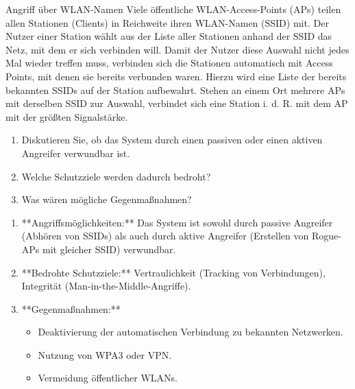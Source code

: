 \documentclass{article}
\begin{document}
\begin{exercise}{Angriff über WLAN-Namen}
  Viele öffentliche WLAN-Access-Points (APs) teilen allen Stationen (Clients) in Reichweite ihren WLAN-Namen (SSID) mit. Der Nutzer einer Station wählt aus der Liste aller Stationen anhand der SSID das Netz, mit dem er sich verbinden will. Damit der Nutzer diese Auswahl nicht jedes Mal wieder treffen muss, verbinden sich die Stationen automatisch mit Access Points, mit denen sie bereits verbunden waren. Hierzu wird eine Liste der bereits bekannten SSIDs auf der Station aufbewahrt. Stehen an einem Ort mehrere APs mit derselben SSID zur Auswahl, verbindet sich eine Station i. d. R. mit dem AP mit der größten Signalstärke.
  \begin{enumerate}
    \item Diskutieren Sie, ob das System durch einen passiven oder einen aktiven Angreifer verwundbar ist.
    \item Welche Schutzziele werden dadurch bedroht?
    \item Was wären mögliche Gegenmaßnahmen?
  \end{enumerate}

  \begin{solution}
    \begin{enumerate}
      \item **Angriffsmöglichkeiten:** Das System ist sowohl durch passive Angreifer (Abhören von SSIDs) als auch durch aktive Angreifer (Erstellen von Rogue-APs mit gleicher SSID) verwundbar.
      \item **Bedrohte Schutzziele:** Vertraulichkeit (Tracking von Verbindungen), Integrität (Man-in-the-Middle-Angriffe).
      \item **Gegenmaßnahmen:**
        \begin{itemize}
          \item Deaktivierung der automatischen Verbindung zu bekannten Netzwerken.
          \item Nutzung von WPA3 oder VPN.
          \item Vermeidung öffentlicher WLANs.
        \end{itemize}
    \end{enumerate}
  \end{solution}
\end{exercise}
\end{document}
